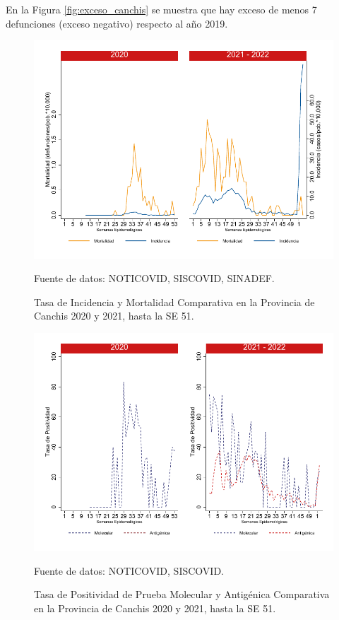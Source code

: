 \documentclass[12pt,a4paper,openany]{book}
\begin{document}
		En la Figura \ref{fig:exceso_canchis} se muestra que hay exceso de menos 7 defunciones (exceso negativo) respecto al año 2019.
		
		\begin{figure}[h]
			\caption{Tasa de Incidencia y Mortalidad Comparativa en la Provincia de Canchis 2020 y 2021, hasta la SE 51.}\label{fig:inc_mort_canchis}
			\begin{center}
				\includegraphics[width=0.7\linewidth]{../figuras/incidencia_mortalidad_20_21_5}
			\end{center}
			{\footnotesize {Fuente de datos: NOTICOVID, SISCOVID, SINADEF.}}
		\end{figure}
		
		\begin{figure}[h]
			\caption{Tasa de Positividad de Prueba Molecular y Antigénica Comparativa en la Provincia de Canchis 2020 y 2021, hasta la SE 51.}\label{fig:positividad_canchis}
			\begin{center}
				\includegraphics[width=0.7\linewidth]{../figuras/positividad_20_21_5}
			\end{center}
			{\footnotesize {Fuente de datos: NOTICOVID, SISCOVID.}}
		\end{figure}
		
\end{document}
